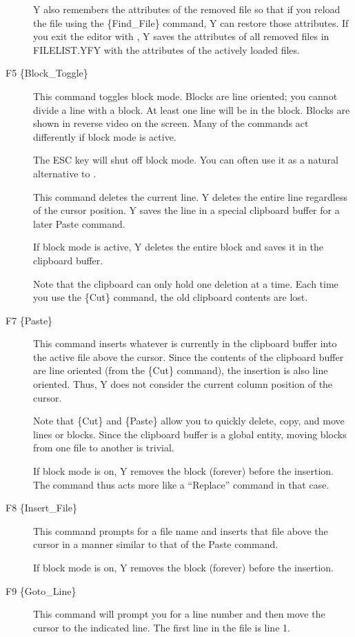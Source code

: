 \begin{description}
  Y also remembers the attributes of the removed file so that if you reload the file using the
  \{Find\_File\} command, Y can restore those attributes. If you exit the editor with
  , Y saves the attributes of all removed files in FILELIST.YFY with the attributes
  of the actively loaded files.

\item[F5 \{Block\_Toggle\}] This command toggles block mode. Blocks are line oriented; you
  cannot divide a line with a block. At least one line will be in the block. Blocks are shown in
  reverse video on the screen. Many of the commands act differently if block mode is active.

  The ESC key will shut off block mode. You can often use it as a natural alternative to
  .

   This command deletes the current line. Y deletes the entire line regardless
  of the cursor position. Y saves the line in a special clipboard buffer for a later Paste
  command.

  If block mode is active, Y deletes the entire block and saves it in the clipboard buffer.

  Note that the clipboard can only hold one deletion at a time. Each time you use the \{Cut\}
  command, the old clipboard contents are lost.

\item[F7 \{Paste\}] This command inserts whatever is currently in the clipboard buffer into the
  active file above the cursor. Since the contents of the clipboard buffer are line oriented
  (from the \{Cut\} command), the insertion is also line oriented. Thus, Y does not consider the
  current column position of the cursor.

  Note that \{Cut\} and \{Paste\} allow you to quickly delete, copy, and move lines or blocks.
  Since the clipboard buffer is a global entity, moving blocks from one file to another is
  trivial.

  If block mode is on, Y removes the block (forever) before the insertion. The command thus acts
  more like a ``Replace'' command in that case.

\item[F8 \{Insert\_File\}] This command prompts for a file name and inserts that file above the
  cursor in a manner similar to that of the Paste command.

  If block mode is on, Y removes the block (forever) before the insertion.

\item [F9 \{Goto\_Line\}] This command will prompt you for a line number and then move the
  cursor to the indicated line. The first line in the file is line 1.


\end{description}
